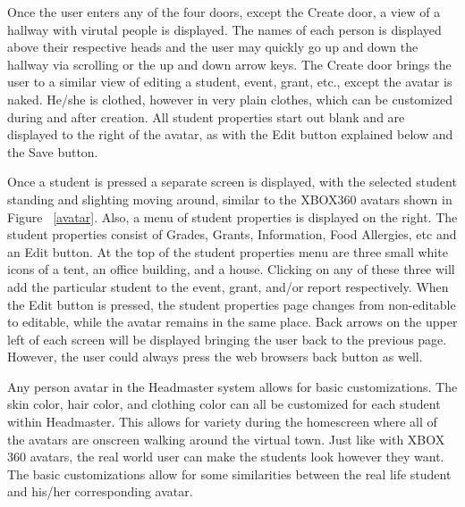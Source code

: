 \documentclass[11pt]{article}
\begin{document}
Once the user enters any of the four doors, except the Create door, a view of a hallway with virutal people is displayed. The names of each person is displayed above their respective heads and the user may quickly go up and down the hallway via scrolling or the up and down arrow keys. The Create door brings the user to a similar view of editing a student, event, grant, etc., except the avatar is naked. He/she is clothed, however in very plain clothes, which can be customized during and after creation. All student properties start out blank and are displayed to the right of the avatar, as with the Edit button explained below and the Save button.

Once a student is pressed a separate screen is displayed, with the selected student standing and slighting moving around, similar to the XBOX360 avatars shown in Figure ~\ref{avatar}. Also, a menu of student properties is displayed on the right. The student properties consist of Grades, Grants, Information, Food Allergies, etc and an Edit button. At the top of the student properties menu are three small white icons of a tent, an office building, and a house. Clicking on any of these three will add the particular student to the event, grant, and/or report respectively. When the Edit button is pressed, the student properties page changes from non-editable to editable, while the avatar remains in the same place. Back arrows on the upper left of each screen will be displayed bringing the user back to the previous page. However, the user could always press the web browsers back button as well.

Any person avatar in the Headmaster system allows for basic customizations. The skin color, hair color, and clothing color can all be customized for each student within Headmaster. This allows for variety during the homescreen where all of the avatars are onscreen walking around the virtual town. Just like with XBOX 360 avatars, the real world user can make the students look however they want. The basic customizations allow for some similarities between the real life student and his/her corresponding avatar.
\end{document}
